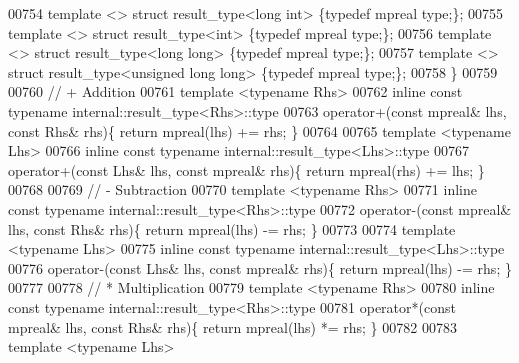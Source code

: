 \begin{DoxyCode}
00754     \textcolor{keyword}{template} <> \textcolor{keyword}{struct }result\_type<long int>            \{\textcolor{keyword}{typedef} mpreal type;\};
00755     \textcolor{keyword}{template} <> \textcolor{keyword}{struct }result\_type<int>                 \{\textcolor{keyword}{typedef} mpreal type;\};
00756     \textcolor{keyword}{template} <> \textcolor{keyword}{struct }result\_type<long long>           \{\textcolor{keyword}{typedef} mpreal type;\};
00757     \textcolor{keyword}{template} <> \textcolor{keyword}{struct }result\_type<unsigned long long>  \{\textcolor{keyword}{typedef} mpreal type;\};
00758 \}
00759 
00760 \textcolor{comment}{// + Addition}
00761 \textcolor{keyword}{template} <\textcolor{keyword}{typename} Rhs>
00762 \textcolor{keyword}{inline} \textcolor{keyword}{const} \textcolor{keyword}{typename} internal::result\_type<Rhs>::type
00763     operator+(\textcolor{keyword}{const} mpreal& lhs, \textcolor{keyword}{const} Rhs& rhs)\{ \textcolor{keywordflow}{return} mpreal(lhs) += rhs;    \}
00764 
00765 \textcolor{keyword}{template} <\textcolor{keyword}{typename} Lhs>
00766 \textcolor{keyword}{inline} \textcolor{keyword}{const} \textcolor{keyword}{typename} internal::result\_type<Lhs>::type
00767     operator+(\textcolor{keyword}{const} Lhs& lhs, \textcolor{keyword}{const} mpreal& rhs)\{ \textcolor{keywordflow}{return} mpreal(rhs) += lhs;    \}
00768 
00769 \textcolor{comment}{// - Subtraction}
00770 \textcolor{keyword}{template} <\textcolor{keyword}{typename} Rhs>
00771 \textcolor{keyword}{inline} \textcolor{keyword}{const} \textcolor{keyword}{typename} internal::result\_type<Rhs>::type
00772     operator-(\textcolor{keyword}{const} mpreal& lhs, \textcolor{keyword}{const} Rhs& rhs)\{ \textcolor{keywordflow}{return} mpreal(lhs) -= rhs;    \}
00773 
00774 \textcolor{keyword}{template} <\textcolor{keyword}{typename} Lhs>
00775 \textcolor{keyword}{inline} \textcolor{keyword}{const} \textcolor{keyword}{typename} internal::result\_type<Lhs>::type
00776     operator-(\textcolor{keyword}{const} Lhs& lhs, \textcolor{keyword}{const} mpreal& rhs)\{ \textcolor{keywordflow}{return} mpreal(lhs) -= rhs;    \}
00777 
00778 \textcolor{comment}{// * Multiplication}
00779 \textcolor{keyword}{template} <\textcolor{keyword}{typename} Rhs>
00780 \textcolor{keyword}{inline} \textcolor{keyword}{const} \textcolor{keyword}{typename} internal::result\_type<Rhs>::type
00781     operator*(\textcolor{keyword}{const} mpreal& lhs, \textcolor{keyword}{const} Rhs& rhs)\{ \textcolor{keywordflow}{return} mpreal(lhs) *= rhs;    \}
00782 
00783 \textcolor{keyword}{template} <\textcolor{keyword}{typename} Lhs>

\end{DoxyCode}
